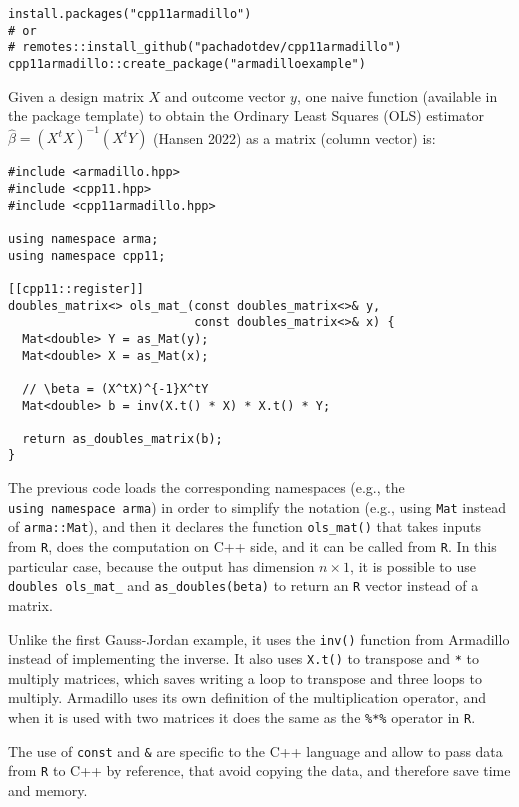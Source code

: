 \begin{verbatim}
install.packages("cpp11armadillo")
# or
# remotes::install_github("pachadotdev/cpp11armadillo")
cpp11armadillo::create_package("armadilloexample")
\end{verbatim}

Given a design matrix \(X\) and outcome vector \(y\), one naive function (available
in the package template) to obtain the Ordinary Least Squares (OLS) estimator
\(\hat{\beta} = (X^tX)^{-1}(X^tY)\) (Hansen 2022) as a matrix (column vector) is:

\begin{verbatim}
#include <armadillo.hpp>
#include <cpp11.hpp>
#include <cpp11armadillo.hpp>

using namespace arma;
using namespace cpp11;

[[cpp11::register]]
doubles_matrix<> ols_mat_(const doubles_matrix<>& y,
                          const doubles_matrix<>& x) {
  Mat<double> Y = as_Mat(y);
  Mat<double> X = as_Mat(x);

  // \beta = (X^tX)^{-1}X^tY
  Mat<double> b = inv(X.t() * X) * X.t() * Y;

  return as_doubles_matrix(b);
}
\end{verbatim}

The previous code loads the corresponding namespaces (e.g., the
\texttt{using\ namespace\ arma}) in order to simplify the notation (e.g., using \texttt{Mat}
instead of \texttt{arma::Mat}), and then it declares the function \texttt{ols\_mat()} that
takes inputs from \texttt{R}, does the computation on C++ side, and it can be called
from \texttt{R}. In this particular case, because the output has dimension \(n\times 1\),
it is possible to use \texttt{doubles\ ols\_mat\_} and \texttt{as\_doubles(beta)} to return an \texttt{R}
vector instead of a matrix.

Unlike the first Gauss-Jordan example, it uses the \texttt{inv()} function from
Armadillo instead of implementing the inverse. It also uses \texttt{X.t()} to
transpose and \texttt{*} to multiply matrices, which saves writing a loop to transpose
and three loops to multiply. Armadillo uses its own definition of the
multiplication operator, and when it is used with two matrices it does the same
as the \texttt{\%*\%} operator in \texttt{R}.

The use of \texttt{const} and \texttt{\&} are specific to the C++ language and allow to pass
data from \texttt{R} to C++ by reference, that avoid copying the data, and therefore
save time and memory.

